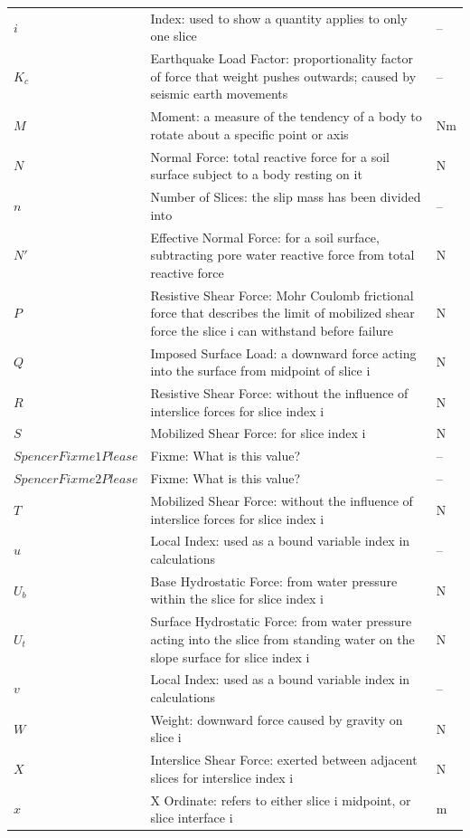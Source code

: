 \documentclass[12pt]{article}
\begin{document}
\begin{longtabu}{l X[l] l}
\\
$i$ & Index: used to show a quantity applies to only one slice & --
\\
${K_{c}}$ & Earthquake Load Factor: proportionality factor of force that weight pushes outwards; caused by seismic earth movements & --
\\
$M$ & Moment: a measure of the tendency of a body to rotate about a specific point or axis & Nm
\\
$N$ & Normal Force: total reactive force for a soil surface subject to a body resting on it & N
\\
$n$ & Number of Slices: the slip mass has been divided into & --
\\
$N'$ & Effective Normal Force: for a soil surface, subtracting pore water reactive force from total reactive force & N
\\
$P$ & Resistive Shear Force: Mohr Coulomb frictional force that describes the limit of mobilized shear force the slice i can withstand before failure & N
\\
$Q$ & Imposed Surface Load: a downward force acting into the surface from midpoint of slice i & N
\\
$R$ & Resistive Shear Force: without the influence of interslice forces for slice index i & N
\\
$S$ & Mobilized Shear Force: for slice index i & N
\\
$SpencerFixme1Please$ & Fixme: What is this value? & --
\\
$SpencerFixme2Please$ & Fixme: What is this value? & --
\\
$T$ & Mobilized Shear Force: without the influence of interslice forces for slice index i & N
\\
$u$ & Local Index: used as a bound variable index in calculations & --
\\
${U_{b}}$ & Base Hydrostatic Force: from water pressure within the slice for slice index i & N
\\
${U_{t}}$ & Surface Hydrostatic Force: from water pressure acting into the slice from standing water on the slope surface for slice index i & N
\\
$v$ & Local Index: used as a bound variable index in calculations & --
\\
$W$ & Weight: downward force caused by gravity on slice i & N
\\
$X$ & Interslice Shear Force: exerted between adjacent slices for interslice index i & N
\\
$x$ & X Ordinate: refers to either slice i midpoint, or slice interface i & m

\end{longtabu}
\end{document}
